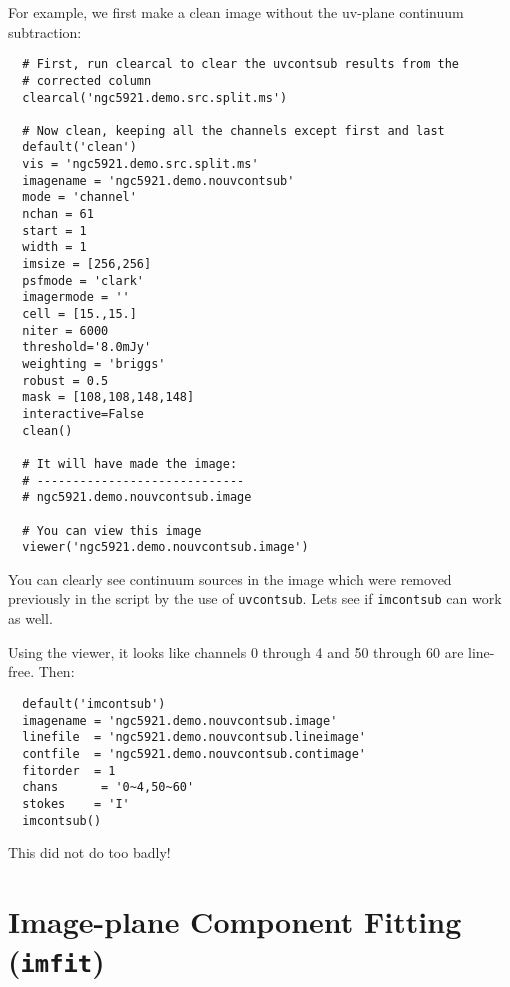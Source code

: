 For example, we first make a clean image without the uv-plane continuum
subtraction:
\small
\begin{verbatim}
  # First, run clearcal to clear the uvcontsub results from the
  # corrected column
  clearcal('ngc5921.demo.src.split.ms')
  
  # Now clean, keeping all the channels except first and last
  default('clean')
  vis = 'ngc5921.demo.src.split.ms'
  imagename = 'ngc5921.demo.nouvcontsub'
  mode = 'channel'
  nchan = 61
  start = 1
  width = 1
  imsize = [256,256]
  psfmode = 'clark'
  imagermode = ''
  cell = [15.,15.]
  niter = 6000
  threshold='8.0mJy'
  weighting = 'briggs'
  robust = 0.5
  mask = [108,108,148,148]
  interactive=False
  clean()
  
  # It will have made the image:
  # -----------------------------
  # ngc5921.demo.nouvcontsub.image

  # You can view this image
  viewer('ngc5921.demo.nouvcontsub.image')
\end{verbatim}
\normalsize
You can clearly see continuum sources in the image which were removed
previously in the script by the use of {\tt uvcontsub}.  Lets see
if {\tt imcontsub} can work as well.

Using the viewer, it looks like channels 0 through 4 and
50 through 60 are line-free.  Then:
\small
\begin{verbatim}
  default('imcontsub')
  imagename = 'ngc5921.demo.nouvcontsub.image'
  linefile  = 'ngc5921.demo.nouvcontsub.lineimage'
  contfile  = 'ngc5921.demo.nouvcontsub.contimage'
  fitorder  = 1
  chans      = '0~4,50~60'
  stokes    = 'I'
  imcontsub()
\end{verbatim}
\normalsize
This did not do too badly!

\section{Image-plane Component Fitting ({\tt imfit})}
\label{section:analysis.imfit}

